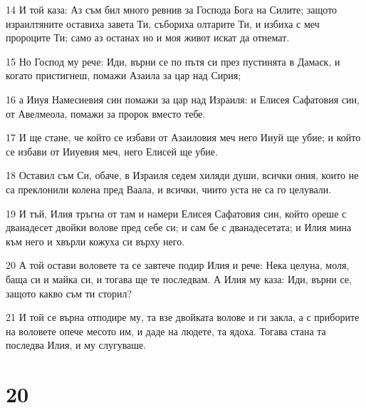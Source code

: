 \par 14 И той каза: Аз съм бил много ревнив за Господа Бога на Силите; защото израилтяните оставиха завета Ти, събориха олтарите Ти, и избиха с меч пророците Ти; само аз останах но и моя живот искат да отнемат.
\par 15 Но Господ му рече: Иди, върни се по пътя си през пустинята в Дамаск, и когато пристигнеш, помажи Азаила за цар над Сирия;
\par 16 а Ииуя Намесиевия син помажи за цар над Израиля: и Елисея Сафатовия син, от Авелмеола, помажи за пророк вместо тебе.
\par 17 И ще стане, че който се избави от Азаиловия меч него Ииуй ще убие; и който се избави от Ииуевия меч, него Елисей ще убие.
\par 18 Оставил съм Си, обаче, в Израиля седем хиляди души, всички ония, които не са преклонили колена пред Ваала, и всички, чиито уста не са го целували.
\par 19 И тъй, Илия тръгна от там и намери Елисея Сафатовия син, който ореше с дванадесет двойки волове пред себе си; и сам бе с дванадесетата; и Илия мина към него и хвърли кожуха си върху него.
\par 20 А той остави воловете та се завтече подир Илия и рече: Нека целуна, моля, баща си и майка си, и тогава ще те последвам. А Илия му каза: Иди, върни се, защото какво съм ти сторил?
\par 21 И той се върна отподире му, та взе двойката волове и ги закла, а с приборите на воловете опече месото им, и даде на людете, та ядоха. Тогава стана та последва Илия, и му слугуваше.

\chapter{20}

